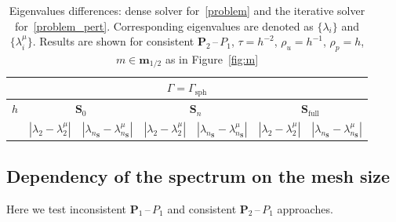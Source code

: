 \documentclass[12pt]{article}
\newcommand{\vect}[1]{\boldsymbol{\mathbf{#1}}}
\newcommand{\sphere}{{\Gamma_{\text{sph}}}}
\begin{document}
\begin{table}[H]
	\centering\footnotesize
	\caption{Eigenvalues differences: dense solver for~\eqref{problem} and the iterative solver for~\eqref{problem_pert}. Corresponding eigenvalues are denoted as $\{\lambda_i\}$ and $\{\lambda_i^\mu\}$. Results are shown for consistent $\vect P_2$\,--\,$P_1$, $\tau = h^{-2}$, $\rho_u = h^{-1}$, $\rho_p = h$, $m \in \vect m_{1/2}$ as in Figure~\ref{fig:m}} 
	\label{tab:p2p1_diff}
	\begin{subtable}{1.\linewidth}
		\centering
		\begin{tabular}[1.2]{|c|c|c|c|c|c|c|}
			\hline
			\multicolumn{7}{|c|}{$\Gamma = \sphere$} \\
			\hline
			\multirow{2}{*}{$h$} & \multicolumn{2}{c|}{$\vect S_0$} & \multicolumn{2}{c|}{$\vect S_n$} & \multicolumn{2}{c|}{$\vect S_{\text{full}}$} \\ 
			\cline{2-7}
			& $|\lambda_2 - \lambda_2^\mu|$ & $|\lambda_{n_{\vect S}} - \lambda_{n_{\vect S}}^\mu|$ & $|\lambda_2 - \lambda_2^\mu|$ & $|\lambda_{n_{\vect S}} - \lambda_{n_{\vect S}}^\mu|$ & $|\lambda_2 - \lambda_2^\mu|$ & $|\lambda_{n_{\vect S}} - \lambda_{n_{\vect S}}^\mu|$ \\ 
			\hline
			
		\end{tabular}
	\end{subtable}%
\end{table}  


\subsection{Dependency of the spectrum on the mesh size}

Here we test inconsistent $\vect P_1$\,--\,$P_1$ and consistent $\vect P_2$\,--\,$P_1$ approaches.
\end{document}
